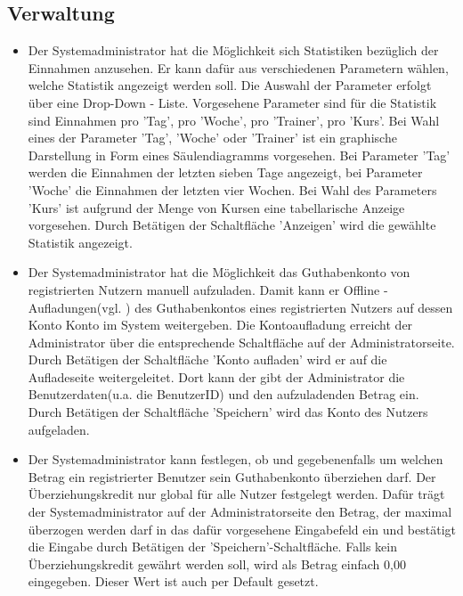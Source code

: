 \documentclass[a4paper]{scrreprt}
\begin{document}
\subsection{Verwaltung}
\begin{itemize}
	\item {}
	Der Systemadministrator hat die Möglichkeit sich Statistiken bezüglich der Einnahmen anzusehen. Er kann dafür aus verschiedenen Parametern wählen, welche Statistik angezeigt werden soll. Die Auswahl der Parameter erfolgt über eine Drop-Down - Liste. Vorgesehene Parameter sind für die Statistik sind Einnahmen pro 'Tag', pro 'Woche', pro 'Trainer', pro 'Kurs'. Bei Wahl eines der Parameter 'Tag', 'Woche' oder 'Trainer' ist ein graphische Darstellung in Form eines Säulendiagramms vorgesehen. Bei Parameter 'Tag' werden die Einnahmen der letzten sieben Tage angezeigt, bei Parameter 'Woche' die Einnahmen der letzten vier Wochen. Bei Wahl des Parameters 'Kurs' ist aufgrund der Menge von Kursen eine tabellarische Anzeige vorgesehen. Durch Betätigen der Schaltfläche 'Anzeigen' wird die gewählte Statistik angezeigt.
	\item {}
	Der Systemadministrator hat die Möglichkeit das Guthabenkonto von  registrierten Nutzern manuell aufzuladen. Damit kann er \glqq Offline - Aufladungen\grqq (vgl. ) des Guthabenkontos eines registrierten Nutzers auf dessen Konto Konto im System weitergeben. Die Kontoaufladung erreicht der Administrator über die entsprechende Schaltfläche auf der Administratorseite. Durch Betätigen der Schaltfläche 'Konto aufladen' wird er auf die Aufladeseite weitergeleitet. Dort kann der gibt der Administrator die Benutzerdaten(u.a. die BenutzerID) und den aufzuladenden Betrag ein. Durch Betätigen der Schaltfläche 'Speichern' wird das Konto des Nutzers aufgeladen.
	\item {}
	Der Systemadministrator kann festlegen, ob und gegebenenfalls um welchen Betrag ein registrierter Benutzer sein Guthabenkonto überziehen darf. Der Überziehungskredit nur global für alle Nutzer festgelegt werden. Dafür trägt der Systemadministrator auf der Administratorseite den Betrag, der maximal überzogen werden darf in das dafür vorgesehene Eingabefeld ein und bestätigt die Eingabe durch Betätigen der 'Speichern'-Schaltfläche.
	Falls kein Überziehungskredit gewährt werden soll, wird als Betrag einfach 0,00 eingegeben. Dieser Wert ist auch per Default gesetzt.
\end{itemize}
\end{document}
